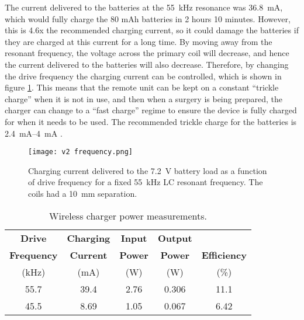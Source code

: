 
The current delivered to the batteries at the \SI{55}{\kilo\hertz} resonance was \SI{36.8}{\milli\ampere}, which would fully charge the 80 mAh batteries in 2 hours 10 minutes. However, this is 4.6x the recommended charging current, so it could damage the batteries if they are charged at this current for a long time. By moving away from the resonant frequency, the voltage across the primary coil will decrease, and hence the current delivered to the batteries will also decrease. Therefore, by changing the drive frequency the charging current can be controlled, which is shown in figure \ref{fig: current frequency}. This means that the remote unit can be kept on a constant ``trickle charge'' when it is not in use, and then when a surgery is being prepared, the charger can change to a ``fast charge'' regime to ensure the device is fully charged for when it needs to be used. The recommended trickle charge for the batteries is \SIrange{2.4}{4}{\milli\ampere} \cite{rs_pro_batteries}.\\

\begin{figure}[ht]
	\centering
	\texttt{[image: v2 frequency.png]}
	\caption{Charging current delivered to the \SI{7.2}{\volt} battery load as a function of drive frequency for a fixed \SI{55}{\kilo\hertz} LC resonant frequency. The coils had a \SI{10}{\milli\metre} separation.}
	\label{fig: current frequency}
\end{figure}

\begin{table}[ht]
	\begin{center}
	\caption{Wireless charger power measurements.}
	\label{tab: efficiency}
	\begin{tabular}{|c|c|c|c|c|}
	\hline
	\textbf{Drive} & \textbf{Charging} & \textbf{Input} & \textbf{Output} & \\
	\textbf{Frequency} & \textbf{Current} & \textbf{Power} & \textbf{Power} & \textbf{Efficiency} \\
	(\si{\kilo\hertz}) & (\si{\milli\ampere}) & (\si{\watt}) & (\si{\watt}) & (\%)\\
	\hline
	55.7 & 39.4 & 2.76 & 0.306 & 11.1\\
	\hline
	45.5 & 8.69 & 1.05 & 0.067 & 6.42\\
	\hline	
	\end{tabular}
	\end{center}
\end{table}

